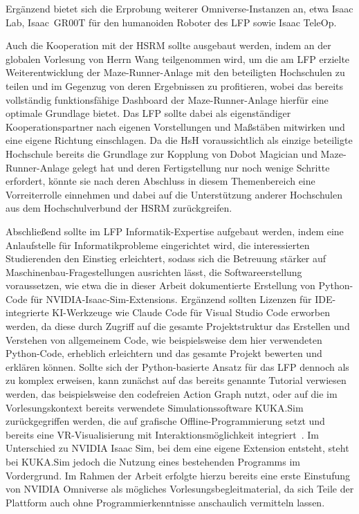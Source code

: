 Ergänzend bietet sich die Erprobung weiterer Omniverse-Instanzen an, etwa Isaac Lab, Isaac~GR00T für den humanoiden Roboter des LFP sowie Isaac TeleOp.

Auch die Kooperation mit der HSRM sollte ausgebaut werden, indem an der globalen Vorlesung von Herrn Wang teilgenommen wird, um die am LFP erzielte Weiterentwicklung der Maze-Runner-Anlage mit den beteiligten Hochschulen zu teilen und im Gegenzug von deren Ergebnissen zu profitieren, wobei das bereits vollständig funktionsfähige Dashboard der Maze-Runner-Anlage hierfür eine optimale Grundlage bietet.
Das LFP sollte dabei als eigenständiger Kooperationspartner nach eigenen Vorstellungen und Maßstäben mitwirken und eine eigene Richtung einschlagen.
Da die HsH voraussichtlich als einzige beteiligte Hochschule bereits die Grundlage zur Kopplung von Dobot Magician und Maze-Runner-Anlage gelegt hat und deren Fertigstellung nur noch wenige Schritte erfordert, könnte sie nach deren Abschluss in diesem Themenbereich eine Vorreiterrolle einnehmen und dabei auf die Unterstützung anderer Hochschulen aus dem Hochschulverbund der HSRM zurückgreifen.

Abschließend sollte im LFP Informatik-Expertise aufgebaut werden, indem eine Anlaufstelle für Informatikprobleme eingerichtet wird, die interessierten Studierenden den Einstieg erleichtert, sodass sich die Betreuung stärker auf Maschinenbau-Fragestellungen ausrichten lässt, die Softwareerstellung voraussetzen, wie etwa die in dieser Arbeit dokumentierte Erstellung von Python-Code für NVIDIA-Isaac-Sim-Extensions.
Ergänzend sollten Lizenzen für IDE-integrierte KI-Werkzeuge wie Claude Code für Visual Studio Code erworben werden, da diese durch Zugriff auf die gesamte Projektstruktur das Erstellen und Verstehen von allgemeinem Code, wie beispielsweise dem hier verwendeten Python-Code, erheblich erleichtern und das gesamte Projekt bewerten und erklären können.
Sollte sich der Python-basierte Ansatz für das LFP dennoch als zu komplex erweisen, kann zunächst auf das bereits genannte Tutorial verwiesen werden, das beispielsweise den codefreien Action Graph nutzt, oder auf die im Vorlesungskontext bereits verwendete Simulationssoftware KUKA.Sim zurückgegriffen werden, die auf grafische Offline-Programmierung setzt und bereits eine VR-Visualisierung mit Interaktionsmöglichkeit integriert~\cite{kuka_sim_overview}.
Im Unterschied zu NVIDIA Isaac Sim, bei dem eine eigene Extension entsteht, steht bei KUKA.Sim jedoch die Nutzung eines bestehenden Programms im Vordergrund. Im Rahmen der Arbeit erfolgte hierzu bereits eine erste Einstufung von NVIDIA Omniverse als mögliches Vorlesungsbegleitmaterial, da sich Teile der Plattform auch ohne Programmierkenntnisse anschaulich vermitteln lassen.
